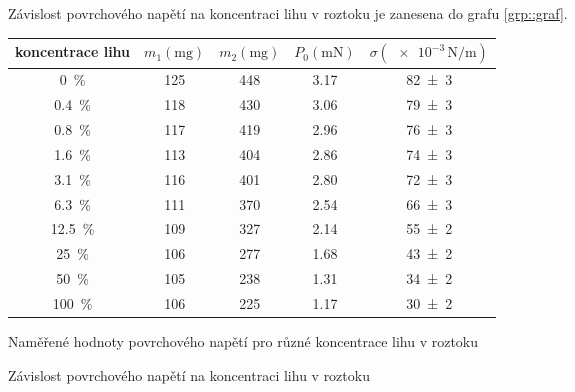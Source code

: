 Závislost povrchového napětí na koncentraci lihu v roztoku je zanesena do grafu \ref{grp::graf}.

\begin{tabulka}[htbp]
\centering
\begin{tabular}{ccccc}
koncentrace lihu & $m_1 (\si{\milli\g})$ & $m_2 (\si{\milli\g})$ & $P_0 (\si{\milli \newton})$ & $\sigma (\num{e-3}\,\si{\newton\per\metre})$ \\ \hline 
\SI{0}{\percent} & \num{125} & \num{448} & \num{3.17} & \num{82(3)} \\
\SI{0.4}{\percent} & \num{118} & \num{430} & \num{3.06} & \num{79(3)} \\
\SI{0.8}{\percent} & \num{117} & \num{419} & \num{2.96} & \num{76(3)} \\
\SI{1.6}{\percent} & \num{113} & \num{404} & \num{2.86} & \num{74(3)} \\
\SI{3.1}{\percent} & \num{116} & \num{401} & \num{2.80} & \num{72(3)} \\
\SI{6.3}{\percent} & \num{111} & \num{370} & \num{2.54} & \num{66(3)} \\
\SI{12.5}{\percent} & \num{109} & \num{327} & \num{2.14} & \num{55(2)} \\
\SI{25}{\percent} & \num{106} & \num{277} & \num{1.68} & \num{43(2)} \\
\SI{50}{\percent} & \num{105} & \num{238} & \num{1.31} & \num{34(2)} \\
\SI{100}{\percent} & \num{106} & \num{225} & \num{1.17} & \num{30(2)} \\
\end{tabular}
\caption{Naměřené hodnoty povrchového napětí pro různé koncentrace lihu v roztoku}
\label{tab::namereny}
\end{tabulka}

\begin{graph}[htbp] 
\centering

\caption{Závislost povrchového napětí na koncentraci lihu v roztoku}
\label{grp::graf}
\end{graph}